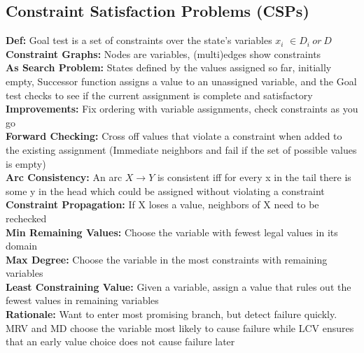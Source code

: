 \documentclass[11pt, a4paper]{article}
\begin{document}
\begin{multicols*}{1}
        \section*{Constraint Satisfaction Problems (CSPs)}
            \textbf{Def:} Goal test is a set of constraints over the state's variables $x_i$ $\in D_i\ or\ D$\\
            \textbf{Constraint Graphs:} Nodes are variables, (multi)edges show constraints\\
            \textbf{As Search Problem:} States defined by the values assigned so far, initially empty, Successor function assigns a value to an unassigned variable, and the Goal test checks to see if the current assignment is complete and satisfactory\\
            \textbf{Improvements:} Fix ordering with variable assignments, check constraints as you go\\
            \textbf{Forward Checking:} Cross off values that violate a constraint when added to the existing assignment (Immediate neighbors and fail if the set of possible values is empty)\\
            \textbf{Arc Consistency:} An arc $X \to Y$ is consistent iff for every x in the tail there is some y in the head which could be assigned without violating a constraint\\
            \textbf{Constraint Propagation:} If X loses a value, neighbors of X need to be rechecked\\
            \textbf{Min Remaining Values:} Choose the variable with fewest legal values in its domain\\
            \textbf{Max Degree:} Choose the variable in the most constraints with remaining variables\\
            \textbf{Least Constraining Value:} Given a variable, assign a value that rules out the fewest values in remaining variables\\
            \textbf{Rationale:} Want to enter most promising branch, but detect failure quickly. MRV and MD choose the variable most likely to cause failure while LCV ensures that an early value choice does not cause failure later
    \end{multicols*}
\end{document}
